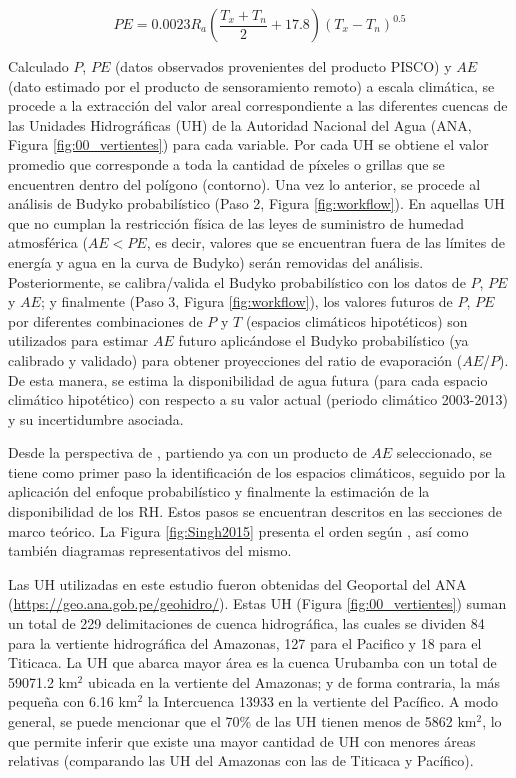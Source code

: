 \documentclass[12pt]{article}
\begin{document}
\begin{equation}
PE = 0.0023R_{a}\left ( \frac{T_{x}+T_{n}}{2} + 17.8 \right )\left ( T_{x}-T_{n} \right )^{0.5}
\end{equation}

Calculado $P$, $PE$ (datos observados provenientes del producto PISCO) y $AE$ (dato estimado por el producto de sensoramiento remoto) a escala climática, se procede a la extracción del valor areal correspondiente a las diferentes cuencas de las Unidades Hidrográficas (UH) de la Autoridad Nacional del Agua (ANA, Figura \ref{fig:00_vertientes}) para cada variable. Por cada UH se obtiene el valor promedio que corresponde a toda la cantidad de píxeles o grillas que se encuentren dentro del polígono (contorno). Una vez lo anterior, se procede al análisis de Budyko probabilístico (Paso 2, Figura \ref{fig:workflow}). En aquellas UH que no cumplan la restricción física de las leyes de suministro de humedad atmosférica ($AE < PE$, es decir, valores que se encuentran fuera de las límites de energía y agua en la curva de Budyko) serán removidas del análisis. Posteriormente, se calibra/valida el Budyko probabilístico con los datos de $P$, $PE$  y $AE$; y finalmente (Paso 3, Figura \ref{fig:workflow}), los valores futuros de $P$, $PE$ por diferentes combinaciones de $P$ y $T$ (espacios climáticos hipotéticos) son utilizados para estimar $AE$ futuro aplicándose el Budyko probabilístico (ya calibrado y validado) para obtener proyecciones del ratio de evaporación ($AE$/$P$). De esta manera, se estima la disponibilidad de agua futura (para cada espacio climático hipotético) con respecto a su valor actual (periodo climático 2003-2013) y su incertidumbre asociada.

Desde la perspectiva de \citet{Singh2015}, partiendo ya con un producto de $AE$ seleccionado, se tiene como primer paso la identificación de los espacios climáticos, seguido por la aplicación del enfoque probabilístico y finalmente la estimación de la disponibilidad de los RH. Estos pasos se encuentran descritos en las secciones de marco teórico. La Figura \ref{fig:Singh2015} presenta el orden según \citet{Singh2015}, así como también diagramas representativos del mismo.

Las UH utilizadas en este estudio fueron obtenidas del Geoportal del ANA (\url{https://geo.ana.gob.pe/geohidro/}). Estas UH (Figura \ref{fig:00_vertientes}) suman un total de 229 delimitaciones de cuenca hidrográfica, las cuales se dividen 84 para la vertiente hidrográfica del Amazonas, 127 para el Pacifico y 18 para el Titicaca. La UH que abarca mayor área es la cuenca Urubamba con un total de 59071.2 km$^{2}$ ubicada en la vertiente del Amazonas; y de forma contraria, la más pequeña con 6.16 km$^{2}$ la Intercuenca 13933 en la vertiente del Pacífico. A modo general, se puede mencionar que el 70\% de las UH tienen menos de 5862 km$^{2}$, lo que permite inferir que existe una mayor cantidad de UH con menores áreas relativas (comparando las UH del Amazonas con las de Titicaca y Pacífico).
\end{document}
